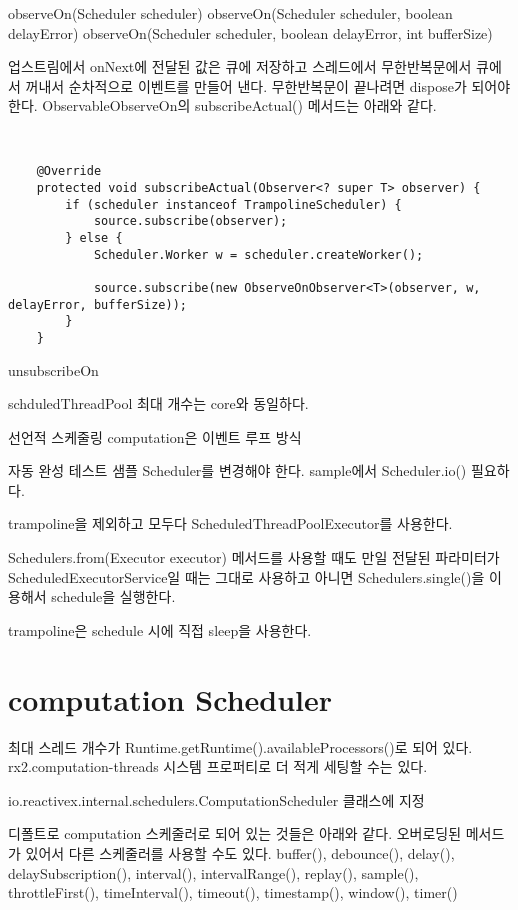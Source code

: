 \documentclass{book}
\begin{document}
{observeOn(Scheduler scheduler)
observeOn(Scheduler scheduler, boolean delayError)
observeOn(Scheduler scheduler, boolean delayError, int bufferSize)

업스트림에서 onNext에 전달된 값은 큐에 저장하고 스레드에서 무한반복문에서 큐에서 꺼내서 순차적으로 이벤트를 만들어 낸다.
무한반복문이 끝나려면 dispose가 되어야 한다.
ObservableObserveOn의 subscribeActual() 메서드는 아래와 같다.
\begin{verbatim}


    @Override
    protected void subscribeActual(Observer<? super T> observer) {
        if (scheduler instanceof TrampolineScheduler) {
            source.subscribe(observer);
        } else {
            Scheduler.Worker w = scheduler.createWorker();

            source.subscribe(new ObserveOnObserver<T>(observer, w, delayError, bufferSize));
        }
    }
\end{verbatim}

unsubscribeOn

schduledThreadPool 최대 개수는 core와 동일하다.

선언적 스케줄링
computation은 이벤트 루프 방식

자동 완성 테스트 샘플
Scheduler를 변경해야 한다.
sample에서 Scheduler.io() 필요하다.

trampoline을 제외하고 모두다 ScheduledThreadPoolExecutor를 사용한다.

Schedulers.from(Executor executor) 메서드를 사용할 때도 만일 전달된 파라미터가 ScheduledExecutorService일 때는
그대로 사용하고 아니면 Schedulers.single()을 이용해서 schedule을 실행한다.

trampoline은 schedule 시에 직접 sleep을 사용한다.

\section{computation Scheduler}
최대 스레드 개수가 Runtime.getRuntime().availableProcessors()로 되어 있다.
rx2.computation-threads 시스템 프로퍼티로 더 적게 세팅할 수는 있다.


io.reactivex.internal.schedulers.ComputationScheduler 클래스에 지정

디폴트로 computation 스케줄러로 되어 있는 것들은 아래와 같다.  오버로딩된 
메서드가 있어서 다른 스케줄러를 사용할 수도 있다.
buffer(), debounce(), delay(), delaySubscription(),
interval(), intervalRange(), 
replay(), sample(), throttleFirst(), timeInterval(), timeout(), timestamp(), window(), 
timer()


}
\end{document}
